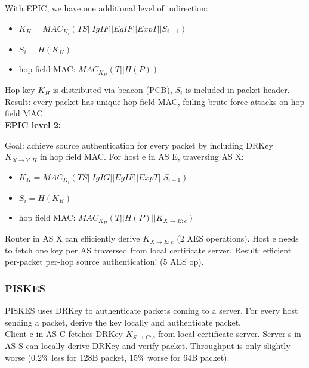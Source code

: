\documentclass[11pt,oneside,a4paper]{article}
\begin{document}
\noindent With EPIC, we have one additional level of indirection:

\vspace{-\topsep}
\begin{itemize}
	\setlength{\itemsep}{0pt}
	\setlength{\parskip}{0pt}
	\item $K_H = MAC_{K_i}(TS||IgIF||EgIF||ExpT||S_{i-1})$
	\item $S_i = H(K_H)$
	\item hop field MAC: $MAC_{K_H}(T||H(P))$
\end{itemize}
\vspace{-\topsep}

\noindent Hop key $K_H$ is distributed via beacon (PCB), $S_i$ is included in packet header. Result: every packet has unique hop field MAC, foiling brute force attacks on hop field MAC.\\

\noindent \textbf{EPIC level 2:}

\noindent Goal: achieve source authentication for every packet by including DRKey $K_{X\rightarrow Y:H}$ in hop field MAC. For host e in AS E, traversing AS X:

\vspace{-\topsep}
\begin{itemize}
	\setlength{\itemsep}{0pt}
	\setlength{\parskip}{0pt}
	\item $K_H = MAC_{K_i}(TS||IgIG||EgIF||ExpT||S_{i-1})$
	\item $S_i = H(K_H)$
	\item hop field MAC: $MAC_{K_H}(T||H(P)||K_{X \rightarrow E:e})$
\end{itemize}
\vspace{-\topsep}

\noindent Router in AS X can efficiently derive $K_{X \rightarrow E:e}$ (2 AES operations). Host e needs to fetch one key per AS traversed from local certificate server. Result: efficient per-packet per-hop source authentication! (5 AES op).


\subsubsection{PISKES}

PISKES uses DRKey to authenticate packets coming to a server. For every host sending a packet, derive the key locally and authenticate packet.\\
Client c in AS C fetches DRKey $K_{S \rightarrow C:c}$ from local certificate server. Server s in AS S can locally derive
DRKey and verify packet. Throughput is only slightly worse (0.2\% less for 128B packet, 15\% worse for 64B packet).
\end{document}
